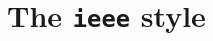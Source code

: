 \documentclass[a4paper]{article}
\begin{document}
\section*{The \texttt{ieee} style}

\nocite{*}

\printbibliography
\end{document}
